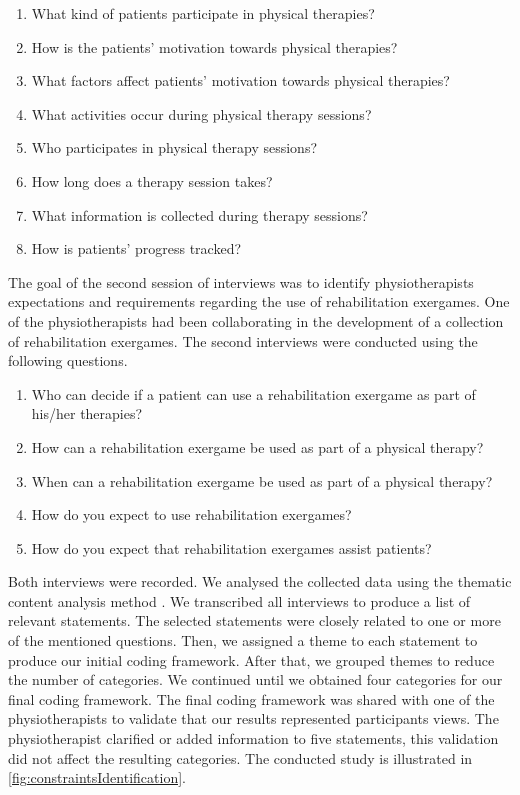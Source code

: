 \begin{enumerate}
    \item What kind of patients participate in physical therapies?
    \item How is the patients' motivation towards physical therapies?
    \item What factors affect patients' motivation towards physical therapies?
    \item What activities occur during physical therapy sessions?
    \item Who participates in physical therapy sessions?
    \item How long does a therapy session takes?
    \item What information is collected during therapy sessions?
    \item How is patients' progress tracked?
\end{enumerate}

The goal of the second session of interviews was to identify physiotherapists expectations and requirements regarding the use of rehabilitation exergames. One of the physiotherapists had been collaborating in the development of a collection of rehabilitation exergames. The second interviews were conducted using the following questions.

\begin{enumerate}
    \item Who can decide if a patient can use a rehabilitation exergame as part of his/her therapies?
    \item How can a rehabilitation exergame be used as part of a physical therapy?
    \item When can a rehabilitation exergame be used as part of a physical therapy?
    \item How do you expect to use rehabilitation exergames?
    \item How do you expect that rehabilitation exergames assist patients?
\end{enumerate}

Both interviews were recorded. We analysed the collected data using the thematic content analysis method \autocite{Burnard2008}. We transcribed all interviews to produce a list of relevant statements. The selected statements were closely related to one or more of the mentioned questions. Then, we assigned a theme to each statement to produce our initial coding framework. After that, we grouped themes to reduce the number of categories. We continued until we obtained four categories for our final coding framework. The final coding framework was shared with one of the physiotherapists to validate that our results represented participants views. The physiotherapist clarified or added information to five statements, this validation did not affect the resulting categories. The conducted study is illustrated in \autoref{fig:constraintsIdentification}.

